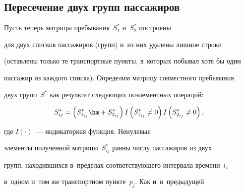 \vspace*{-1pt}





\subsection{Пересечение двух групп пассажиров}





\vspace*{-1pt}





      Пусть теперь матрицы пребывания~$S_1^*$ и~$S_2^*$ построены 


для двух списков пассажиров (групп) и~из них удалены лишние строки 


(оставлены только те транспортные пункты, в~которых побывал хотя бы один 


пассажир из каждого списка). Определим матрицу совместного пребывания 


двух групп~$S^*$ как результат следующих поэлементных операций: 





\vspace*{1pt}





\noindent


$$


S_{ij}^*= \left(S^*_{1_{ij}}\hm+ S^*_{2_{ij}}\right)I\left(S^*_{1_{ij}}\not=0\right) 


I\left(S^*_{2_{ij}}\not=0\right),


$$





\vspace*{-2pt}





\noindent


 где $I(\cdot)$~--- индикаторная функция. Ненулевые 


элементы полученной матрицы~$S^*_{ij}$ равны числу пассажиров из двух 


групп, находившихся в~пределах соответствующего интервала времени~$t_i$ 


в~одном и~том же транспортном пункте~$p_j$. Как и~в~предыду\-щей 


